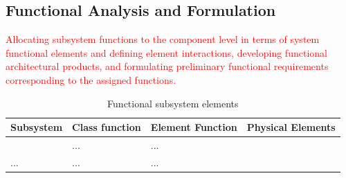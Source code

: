 \documentclass[a4paper,11pt,fleqn]{report}
\begin{document}
\subsection{Functional Analysis and Formulation} 
\textcolor{red}{Allocating subsystem functions to the component level in terms of system functional elements and defining element interactions, developing functional architectural products, and formulating preliminary functional requirements corresponding to the assigned functions.}
%
\begin{table}[h!]
\caption {Functional subsystem elements} \label{tb: Functional_SS_elements} 
\begin{center}
\begin{tabular}{p{4cm}|p{4cm}|p{4cm}|p{4cm}}\toprule
	{\textbf{Subsystem}} & {\textbf{Class function}} & {\textbf{Element Function}} & {\textbf{Physical Elements}}\\ \midrule
    \textcolor{Format used by sample project} & ... & ...\\
    \hline
    ... & ... & ...\\

    \bottomrule
\end{tabular}
\end{center}
\end{table}
%
\end{document}

